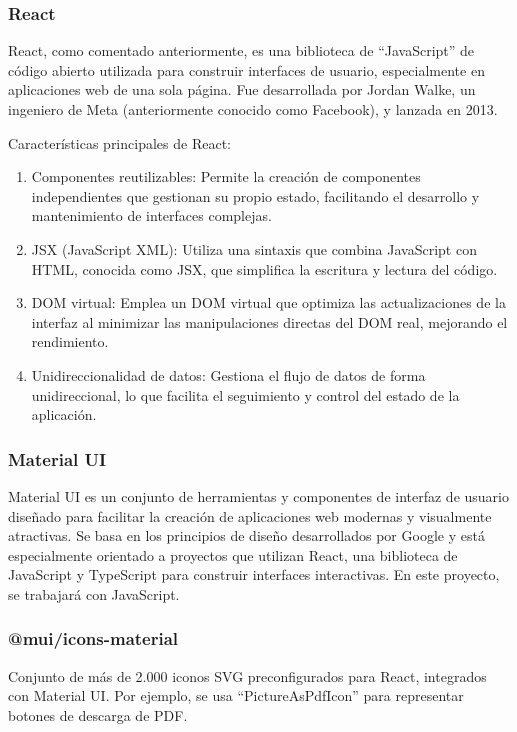 \subsubsection*{React\cite{reactDocs}}
React, como comentado anteriormente, es una biblioteca de ``JavaScript'' de código abierto utilizada para construir interfaces de usuario, especialmente en aplicaciones web de una sola página. Fue desarrollada por Jordan Walke, un ingeniero de Meta (anteriormente conocido como Facebook), y lanzada en 2013.

Características principales de React:
\begin{enumerate}
    \item Componentes reutilizables: Permite la creación de componentes independientes que gestionan su propio estado, facilitando el desarrollo y mantenimiento de interfaces complejas.
    \item JSX (JavaScript XML): Utiliza una sintaxis que combina JavaScript con HTML, conocida como JSX, que simplifica la escritura y lectura del código.
    \item DOM virtual: Emplea un DOM virtual que optimiza las actualizaciones de la interfaz al minimizar las manipulaciones directas del DOM real, mejorando el rendimiento.
    \item Unidireccionalidad de datos: Gestiona el flujo de datos de forma unidireccional, lo que facilita el seguimiento y control del estado de la aplicación.
\end{enumerate}

\subsubsection*{Material UI \cite{materialUi}}
Material UI es un conjunto de herramientas y componentes de interfaz de usuario diseñado para facilitar la creación de aplicaciones web modernas y visualmente atractivas. Se basa en los principios de diseño desarrollados por Google y está especialmente orientado a proyectos que utilizan React, una biblioteca de JavaScript y TypeScript para construir interfaces interactivas. En este proyecto, se trabajará con JavaScript.

\subsubsection*{@mui/icons-material\cite{muiicons}}
Conjunto de más de 2.000 iconos SVG preconfigurados para React, integrados con Material UI. Por ejemplo, se usa ``PictureAsPdfIcon'' para representar botones de descarga de PDF.

